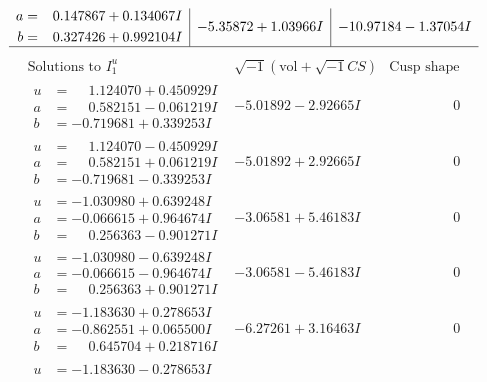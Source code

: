 \documentclass[1p]{elsarticle_modified}
\theoremstyle{definition}
\newcommand{\I}{\sqrt{-1}}
\begin{document}
$$\begin{array}{c|c|c}
\begin{aligned}
a &= \phantom{-}0.147867 + 0.134067 I \\
b &= \phantom{-}0.327426 + 0.992104 I\end{aligned}
 & -5.35872 + 1.03966 I & -10.97184 - 1.37054 I\\
 \hline 
 \end{array}$$\newpage$$\begin{array}{c|c|c}  
\text{Solutions to }I^u_{1}& \I (\text{vol} + \sqrt{-1}CS) & \text{Cusp shape}\\
 \hline 
\begin{aligned}
u &= \phantom{-}1.124070 + 0.450929 I \\
a &= \phantom{-}0.582151 - 0.061219 I \\
b &= -0.719681 + 0.339253 I\end{aligned}
 & -5.01892 - 2.92665 I & \phantom{-0.000000 } 0 \\ \hline\begin{aligned}
u &= \phantom{-}1.124070 - 0.450929 I \\
a &= \phantom{-}0.582151 + 0.061219 I \\
b &= -0.719681 - 0.339253 I\end{aligned}
 & -5.01892 + 2.92665 I & \phantom{-0.000000 } 0 \\ \hline\begin{aligned}
u &= -1.030980 + 0.639248 I \\
a &= -0.066615 + 0.964674 I \\
b &= \phantom{-}0.256363 - 0.901271 I\end{aligned}
 & -3.06581 + 5.46183 I & \phantom{-0.000000 } 0 \\ \hline\begin{aligned}
u &= -1.030980 - 0.639248 I \\
a &= -0.066615 - 0.964674 I \\
b &= \phantom{-}0.256363 + 0.901271 I\end{aligned}
 & -3.06581 - 5.46183 I & \phantom{-0.000000 } 0 \\ \hline\begin{aligned}
u &= -1.183630 + 0.278653 I \\
a &= -0.862551 + 0.065500 I \\
b &= \phantom{-}0.645704 + 0.218716 I\end{aligned}
 & -6.27261 + 3.16463 I & \phantom{-0.000000 } 0 \\ \hline\begin{aligned}
u &= -1.183630 - 0.278653 I \\

\end{aligned}
\end{array}$$
\end{document}
